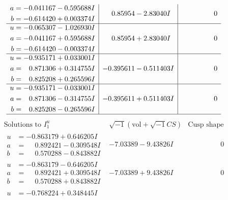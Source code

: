 \documentclass[1p]{elsarticle_modified}
\theoremstyle{definition}
\newcommand{\I}{\sqrt{-1}}
\begin{document}
$$\begin{array}{c|c|c}
\begin{aligned}
a &= -0.041167 - 0.595688 I \\
b &= -0.614420 + 0.003374 I\end{aligned}
 & \phantom{-}0.85954 - 2.83040 I & \phantom{-0.000000 } 0 \\ \hline\begin{aligned}
u &= -0.065307 - 1.026930 I \\
a &= -0.041167 + 0.595688 I \\
b &= -0.614420 - 0.003374 I\end{aligned}
 & \phantom{-}0.85954 + 2.83040 I & \phantom{-0.000000 } 0 \\ \hline\begin{aligned}
u &= -0.935171 + 0.033001 I \\
a &= \phantom{-}0.871306 + 0.314755 I \\
b &= \phantom{-}0.825208 + 0.265596 I\end{aligned}
 & -0.395611 - 0.511403 I & \phantom{-0.000000 } 0 \\ \hline\begin{aligned}
u &= -0.935171 - 0.033001 I \\
a &= \phantom{-}0.871306 - 0.314755 I \\
b &= \phantom{-}0.825208 - 0.265596 I\end{aligned}
 & -0.395611 + 0.511403 I & \phantom{-0.000000 } 0\\
 \hline 
 \end{array}$$\newpage$$\begin{array}{c|c|c}  
\text{Solutions to }I^u_{1}& \I (\text{vol} + \sqrt{-1}CS) & \text{Cusp shape}\\
 \hline 
\begin{aligned}
u &= -0.863179 + 0.646205 I \\
a &= \phantom{-}0.892421 - 0.309548 I \\
b &= \phantom{-}0.570288 - 0.843882 I\end{aligned}
 & -7.03389 - 9.43826 I & \phantom{-0.000000 } 0 \\ \hline\begin{aligned}
u &= -0.863179 - 0.646205 I \\
a &= \phantom{-}0.892421 + 0.309548 I \\
b &= \phantom{-}0.570288 + 0.843882 I\end{aligned}
 & -7.03389 + 9.43826 I & \phantom{-0.000000 } 0 \\ \hline\begin{aligned}
u &= -0.768224 + 0.348445 I \\

\end{aligned}
\end{array}$$
\end{document}
